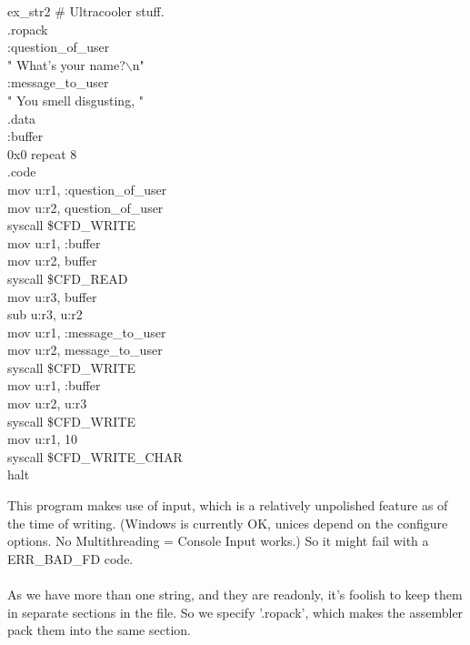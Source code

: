 \documentclass[a4paper,oneside,openany]{book}
\begin{document}
\begin{codefile}{ex\_str2}
\# Ultracooler stuff.\\
.ropack\\
:question\_of\_user\\
\>	" What's your name?$\backslash$n"\\
:message\_to\_user\\
\>	"  You smell disgusting, "\\
.data\\
:buffer\\
\>	0x0 repeat 8\\
.code\\
\>	mov u:r1, :question\_of\_user\\
\>	mov u:r2, \bsz{}question\_of\_user\\
\>	syscall \$CFD\_WRITE\\
\>	mov u:r1, :buffer\\
\>	mov u:r2, \bsz{}buffer\\
\>	syscall \$CFD\_READ\\
\>	mov u:r3, \bsz{}buffer\\
\>	sub u:r3, u:r2\\
\>	mov u:r1, :message\_to\_user\\
\>	mov u:r2, \bsz{}message\_to\_user\\
\>	syscall \$CFD\_WRITE\\
\>	mov u:r1, :buffer\\
\>	mov u:r2, u:r3\\
\>	syscall \$CFD\_WRITE\\
\>	mov u:r1, 10\\
\>	syscall \$CFD\_WRITE\_CHAR\\
\>	halt
\end{codefile}
This program makes use of input, which is a relatively unpolished feature
as of the time of writing. (Windows is currently OK, unices depend on the
configure options. No Multithreading = Console Input works.) So it might
fail with a ERR\_BAD\_FD code.\\
\\
As we have more than one string, and they are readonly, it's foolish to keep them
in separate sections in the file. So we specify '.ropack', which makes the assembler
pack them into the same section.
\end{document}
